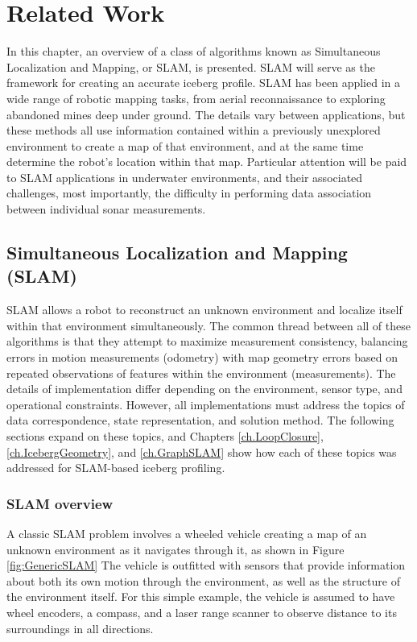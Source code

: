 
\chapter{Related Work}
\label{ch.RelatedWork}

In this chapter, an overview of a class of algorithms known as Simultaneous Localization and Mapping, or SLAM, is presented. SLAM will serve as the framework for creating an accurate iceberg profile. SLAM has been applied  in a wide range of robotic mapping tasks, from aerial reconnaissance to exploring abandoned mines deep under ground. The details vary between applications, but these methods all use information contained within a previously unexplored environment to create a map of that environment, and at the same time determine the robot's location within that map. Particular attention will be paid to SLAM applications in underwater environments, and their associated challenges, most importantly, the difficulty in performing data association between individual sonar measurements. 

\section{Simultaneous Localization and Mapping (SLAM)}
\label{sec.SLAM}

SLAM allows a robot to reconstruct an unknown environment and localize itself within that environment simultaneously.  The common thread between all of these algorithms is that they attempt to maximize measurement consistency, balancing errors in motion measurements (odometry) with map geometry errors based on repeated observations of features within the environment (measurements). The details of implementation differ depending on the environment, sensor type, and operational constraints. However, all implementations must address the topics of data correspondence, state representation, and solution method. The following sections expand on these topics, and Chapters \ref{ch.LoopClosure}, \ref{ch.IcebergGeometry}, and \ref{ch.GraphSLAM} show how each of these topics was addressed for SLAM-based iceberg profiling.

\subsection{SLAM overview}

\label{sec:genericSLAM}
A classic SLAM problem involves a wheeled vehicle creating a map of an unknown environment as it navigates through it, as shown in Figure \ref{fig:GenericSLAM} The vehicle is outfitted with sensors that provide information about both its own motion through the environment, as well as the structure of the environment itself. For this simple example, the vehicle is assumed to have wheel encoders, a compass, and a laser range scanner to observe distance to its surroundings in all directions.

